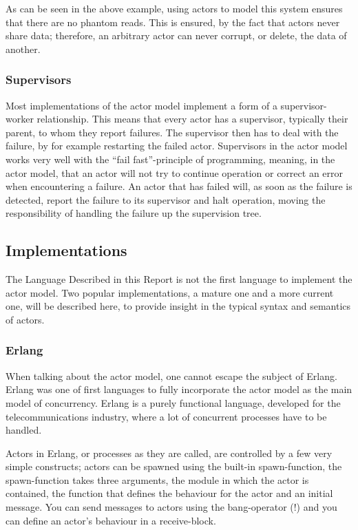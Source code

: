 As can be seen in the above example, using actors to model this system ensures that there are no phantom reads. This is ensured, by the fact that actors never share data; therefore, an arbitrary actor can never corrupt, or delete, the data of another.

\subsubsection{Supervisors}
Most implementations of the actor model implement a form of a supervisor-worker relationship. This means that every actor has a supervisor, typically their parent, to whom they report failures. The supervisor then has to deal with the failure, by for example restarting the failed actor.
Supervisors in the actor model works very well with the \enquote{fail fast}-principle of programming, meaning, in the actor model, that an actor will not try to continue operation or correct an error when encountering a failure. An actor that has failed will, as soon as the failure is detected, report the failure to its supervisor and halt operation, moving the responsibility of handling the failure up the supervision tree.

\subsection{Implementations}\label{sub:implementations}
The Language Described in this Report is not the first language to implement the actor model. Two popular implementations, a mature one and a more current one, will be described here, to provide insight in the typical syntax and semantics of actors.

\subsubsection{Erlang}
When talking about the actor model, one cannot escape the subject of Erlang. Erlang was one of first languages to fully incorporate the actor model as the main model of concurrency. Erlang is a purely functional language, developed for the telecommunications industry, where a lot of concurrent processes have to be handled. 

Actors in Erlang, or processes as they are called, are controlled by a few very simple constructs; actors can be spawned using the built-in spawn-function, the spawn-function takes three arguments, the module in which the actor is contained, the function that defines the behaviour for the actor and an initial message. You can send messages to actors using the bang-operator (!) and you can define an actor's behaviour in a receive-block.


